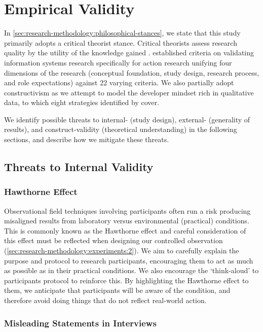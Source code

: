 \section{Empirical Validity}
\label{sec:research-methodology:empirical-validity}

In \cref{sec:research-methodology:philosophical-stances}, we state that this study primarily adopts a critical theorist stance. Critical theorists assess research quality by the utility of the knowledge gained \citep{Easterbrook:2007ws}. \citet{Lau:1999vs} established criteria on validating information systems research specifically for action research unifying four dimensions of the research (conceptual foundation, study design, research process, and role expectations) against 22 varying criteria. We also partially adopt constructivism as we attempt to model the developer mindset rich in qualitative data, to which eight strategies identified by \citet{Creswell:2017vn} cover.

We identify possible threats to internal- (study design), external- (generality of results), and construct-validity (theoretical understanding) in the following sections, and describe how we mitigate these threats.

\subsection{Threats to Internal Validity}

\subsubsection{Hawthorne Effect}

Observational field techniques involving participants often run a risk producing misaligned results from laboratory versus environmental (practical) conditions. This is commonly known as the Hawthorne effect  and careful consideration of this effect must be reflected when designing our controlled observation (\cref{sec:research-methodology:experiments:2}). We aim to carefully explain the purpose and protocol to research participants, encouraging them to act as much as possible as in their practical conditions. We also encourage the `think-aloud' to participants protocol to reinforce this. By highlighting the Hawthorne effect to them, we anticipate that participants will be aware of the condition, and therefore avoid doing things that do not reflect real-world action.

\subsubsection{Misleading Statements in Interviews}

